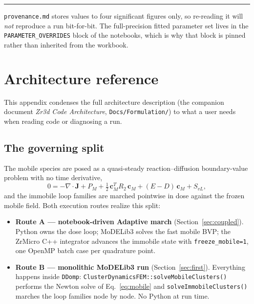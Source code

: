 \documentclass[11pt]{article}
\newcommand{\ZrM}{\textsf{ZrMicro}}
\newcommand{\MoD}{\textsf{MoDELib3}}
\newcommand{\code}[1]{\texttt{\small #1}}
\newcommand{\file}[1]{\texttt{\footnotesize #1}}
\newenvironment{warnbox}
  {\par\medskip\noindent
   \begin{minipage}{\textwidth}
   {\color{red!60!black}\rule{\textwidth}{0.8pt}}\par\smallskip
   \small\noindent{\color{red!60!black}\textbf{Warning.}}\space}
  {\par\smallskip\noindent{\color{red!60!black}\rule{\textwidth}{0.8pt}}
   \end{minipage}\par\medskip}
\begin{document}
\begin{warnbox}
\file{provenance.md} stores values to four significant figures only, so
re-reading it will \emph{not} reproduce a run bit-for-bit. The
full-precision fitted parameter set lives in the
\code{PARAMETER\_OVERRIDES} block of the notebooks, which is why that block
is pinned rather than inherited from the workbook.
\end{warnbox}

\appendix
\section{Architecture reference}
\label{app:arch}

This appendix condenses the full architecture description (the companion
document \emph{Zr3d Code Architecture}, \file{Docs/Formulation/}) to what a
user needs when reading code or diagnosing a run.

\subsection{The governing split}

The mobile species are posed as a quasi-steady reaction--diffusion
boundary-value problem with no time derivative,
\begin{equation}
0 = -\nabla\!\cdot\!\boldsymbol{J} + P_M
    + \tfrac{1}{2}\,\boldsymbol{c}_M^{T} R_2\,\boldsymbol{c}_M
    + (E-D)\,\boldsymbol{c}_M + S_{vL},
\label{eq:mobile}
\end{equation}
and the immobile loop families are marched pointwise in dose against the
frozen mobile field. Both execution routes realize this split:

\begin{itemize}
\item \textbf{Route A --- notebook-driven Adaptive march}
(Section~\ref{sec:coupled}). Python owns the dose loop; \MoD{} solves the
fast mobile BVP; the \ZrM{} C++ integrator advances the immobile state with
\code{freeze\_mobile=1}, one OpenMP batch case per quadrature point.
\item \textbf{Route B --- monolithic \MoD{} run}
(Section~\ref{sec:first}). Everything happens inside \code{DDomp}:
\code{ClusterDynamicsFEM::solveMobileClusters()} performs the Newton solve
of Eq.~\eqref{eq:mobile} and \code{solveImmobileClusters()} marches the loop
families node by node. No Python at run time.
\end{itemize}
\end{document}

